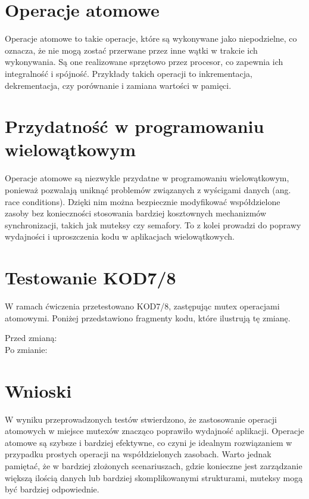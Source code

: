 \documentclass{article}
\begin{document}
    \section*{Operacje atomowe}
    Operacje atomowe to takie operacje, które są wykonywane jako niepodzielne, co oznacza, że nie mogą zostać przerwane przez inne wątki w trakcie ich wykonywania. Są one realizowane sprzętowo przez procesor, co zapewnia ich integralność i spójność. Przykłady takich operacji to inkrementacja, dekrementacja, czy porównanie i zamiana wartości w pamięci.

    \section*{Przydatność w programowaniu wielowątkowym}
    Operacje atomowe są niezwykle przydatne w programowaniu wielowątkowym, ponieważ pozwalają uniknąć problemów związanych z wyścigami danych (ang. race conditions). Dzięki nim można bezpiecznie modyfikować współdzielone zasoby bez konieczności stosowania bardziej kosztownych mechanizmów synchronizacji, takich jak muteksy czy semafory. To z kolei prowadzi do poprawy wydajności i uproszczenia kodu w aplikacjach wielowątkowych.
    
    \section*{Testowanie KOD7/8}
    W ramach ćwiczenia przetestowano KOD7/8, zastępując mutex operacjami atomowymi. Poniżej przedstawiono fragmenty kodu, które ilustrują tę zmianę.

    \clearpage
    Przed zmianą:
     \\Po zmianie:
    \clearpage
        

    
    

    \section*{Wnioski}
    W wyniku przeprowadzonych testów stwierdzono, że zastosowanie operacji atomowych w miejsce mutexów znacząco poprawiło wydajność aplikacji. Operacje atomowe są szybsze i bardziej efektywne, co czyni je idealnym rozwiązaniem w przypadku prostych operacji na współdzielonych zasobach. Warto jednak pamiętać, że w bardziej złożonych scenariuszach, gdzie konieczne jest zarządzanie większą ilością danych lub bardziej skomplikowanymi strukturami, muteksy mogą być bardziej odpowiednie.
\end{document}
